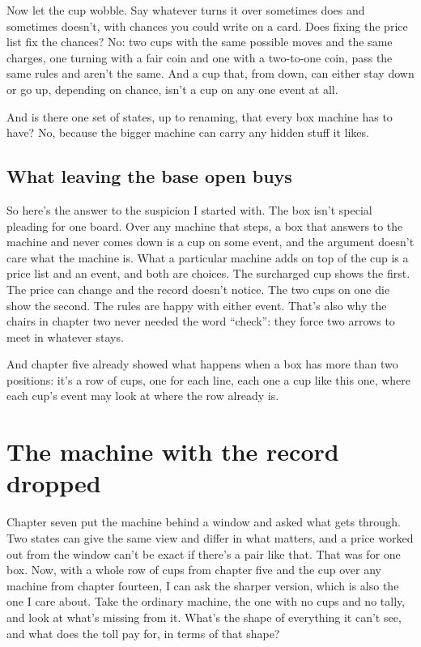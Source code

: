 \documentclass[11pt,twoside]{article}
\theoremstyle{thielethm}
\theoremstyle{thieledef}
\theoremstyle{thieledef}
\theoremstyle{thieledef}
\theoremstyle{thielethm}
\theoremstyle{thieleobs}
\theoremstyle{thielethm}
\begin{document}
Now let the cup wobble. Say whatever turns it over sometimes does and sometimes doesn't, with chances you could write on a card. Does fixing the price list fix the chances? No: two cups with the same possible moves and the same charges, one turning with a fair coin and one with a two-to-one coin, pass the same rules and aren't the same. And a cup that, from down, can either stay down or go up, depending on chance, isn't a cup on any one event at all.

And is there one set of states, up to renaming, that every box machine has to have? No, because the bigger machine can carry any hidden stuff it likes.

\subsection{What leaving the base open buys}

So here's the answer to the suspicion I started with. The box isn't special pleading for one board. Over any machine that steps, a box that answers to the machine and never comes down is a cup on some event, and the argument doesn't care what the machine is. What a particular machine adds on top of the cup is a price list and an event, and both are choices. The surcharged cup shows the first. The price can change and the record doesn't notice. The two cups on one die show the second. The rules are happy with either event. That's also why the chairs in chapter two never needed the word ``check'': they force two arrows to meet in whatever stays.

And chapter five already showed what happens when a box has more than two positions: it's a row of cups, one for each line, each one a cup like this one, where each cup's event may look at where the row already is.

\section{The machine with the record dropped}
\label{sec:dropped}

Chapter seven put the machine behind a window and asked what gets through. Two states can give the same view and differ in what matters, and a price worked out from the window can't be exact if there's a pair like that. That was for one box. Now, with a whole row of cups from chapter five and the cup over any machine from chapter fourteen, I can ask the sharper version, which is also the one I care about. Take the ordinary machine, the one with no cups and no tally, and look at what's missing from it. What's the shape of everything it can't see, and what does the toll pay for, in terms of that shape?
\end{document}
